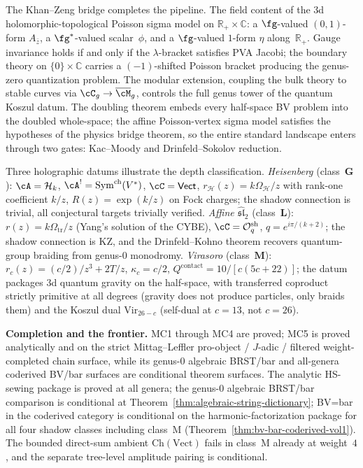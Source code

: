 The Khan--Zeng bridge completes the pipeline. The field content of the
3d holomorphic-topological Poisson sigma model on
$\mathbb R_+\times\mathbb C$: a $\fg$-valued $(0,1)$-form $A_{\bar z}$,
a $\fg^*$-valued scalar~$\phi$, and a $\fg$-valued $1$-form
$\eta$ along~$\mathbb R_+$. Gauge invariance holds if and only if
the $\lambda$-bracket satisfies PVA Jacobi; the boundary theory on
$\{0\}\times\mathbb C$ carries a $(-1)$-shifted Poisson bracket producing
the genus-zero quantization problem. The modular extension, coupling the
bulk theory to stable curves via $\cC_g\to\overline{\cM}_g$, controls
the full genus tower of the quantum Koszul datum. The doubling theorem
embeds every half-space BV problem into the doubled whole-space; the
affine Poisson-vertex sigma model satisfies the hypotheses of the physics
bridge theorem, so the entire standard landscape enters through two
gates: Kac--Moody and Drinfeld--Sokolov reduction.

Three holographic datums illustrate the depth classification.
\emph{Heisenberg} (class~$\mathbf{G}$): $\cA=\mathcal H_k$,
$\cA^!=\mathrm{Sym}^{\mathrm{ch}}(V^*)$, $\cC=\mathsf{Vect}$,
$r_{\mathcal H}(z)=k\Omega_{\mathcal H}/z$ with rank-one coefficient
$k/z$, $R(z)=\exp(k/z)$ on Fock charges; the shadow connection is trivial, all
conjectural targets trivially verified.
\emph{Affine $\widehat{\mathfrak{sl}}_2$} (class~$\mathbf{L}$):
$r(z)=k\Omega_{\mathrm{tr}}/z$ (Yang's solution of the CYBE),
$\cC=\mathcal O_q^{\mathrm{sh}}$, $q=e^{i\pi/(k+2)}$; the shadow
connection is KZ, and the Drinfeld--Kohno theorem recovers quantum-group
braiding from genus-$0$ monodromy.
\emph{Virasoro} (class~$\mathbf{M}$):
$r_c(z)=(c/2)/z^3+2T/z$, $\kappa_c=c/2$,
$Q^{\mathrm{contact}}=10/[c(5c+22)]$; the datum packages 3d quantum
gravity on the half-space, with transferred coproduct strictly primitive
at all degrees (gravity does not produce particles, only braids them) and
the Koszul dual $\mathrm{Vir}_{26-c}$ (self-dual at $c=13$, not $c=26$).

\bigskip

\noindent\textbf{Completion and the frontier.}
MC1 through MC4 are proved; MC5 is proved analytically and on the strict
Mittag--Leffler pro-object / $J$-adic / filtered weight-completed chain
surface, while its genus-$0$ algebraic BRST/bar and all-genera coderived
BV/bar surfaces are conditional theorem surfaces. The analytic HS-sewing
package is proved at all genera; the genus-$0$ algebraic BRST/bar
comparison is conditional at Theorem~\ref{thm:algebraic-string-dictionary};
BV=bar in the coderived category is conditional on the harmonic-factorization
package for all four shadow classes including class~M
(Theorem~\ref{thm:bv-bar-coderived-vol1}). The bounded direct-sum ambient
$\mathrm{Ch}(\mathrm{Vect})$ fails in class~M already at weight~$4$, and the
separate tree-level amplitude pairing is conditional.


